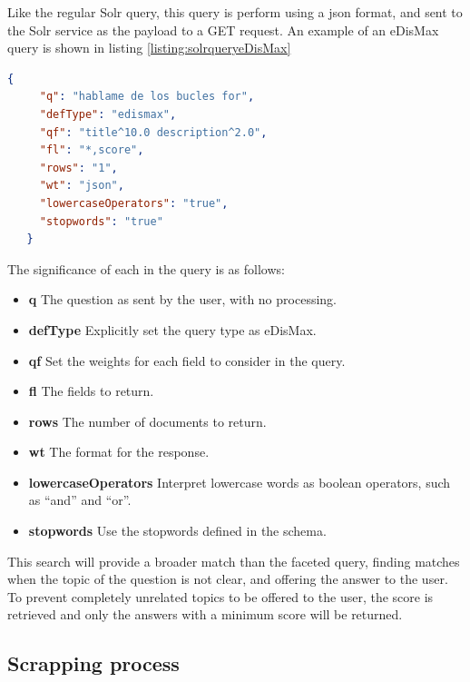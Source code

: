 Like the regular Solr query, this query is perform using a json format, and sent to the Solr service as the payload to a GET request. An example of an \ac{eDisMax} query is shown in listing \ref{listing:solrqueryeDisMax}

\begin{center} 
  \begin{lstlisting}[language=json, caption=Example \ac{eDisMax} query for Solr, label=listing:solrqueryeDisMax]
   {
     "q": "hablame de los bucles for",
     "defType": "edismax",
     "qf": "title^10.0 description^2.0",
     "fl": "*,score",
     "rows": "1",
     "wt": "json",
     "lowercaseOperators": "true",
     "stopwords": "true"
   }  
  \end{lstlisting}
\end{center}

The significance of each in the query is as follows:

\begin{itemize}
 \item \textbf{q} The question as sent by the user, with no processing.
 \item \textbf{defType} Explicitly set the query type as \ac{eDisMax}.
 \item \textbf{qf} Set the weights for each field to consider in the query.
 \item \textbf{fl} The fields to return.
 \item \textbf{rows} The number of documents to return.
 \item \textbf{wt} The format for the response.
 \item \textbf{lowercaseOperators} Interpret lowercase words as boolean operators, such as ``and'' and ``or''.
 \item \textbf{stopwords} Use the stopwords defined in the schema.
\end{itemize}

This search will provide a broader match than the faceted query, finding matches when the topic of the question is not clear, and offering the answer to the user. To prevent completely unrelated topics to be offered to the user, the score is retrieved and only the answers with a minimum score will be returned.


\subsection{Scrapping process}



